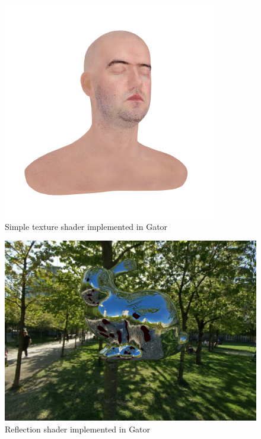 {\begin{figure}
\centering
\includegraphics[width=.7\linewidth]{fig/texture.png}
\caption{Simple texture shader implemented in Gator}
\label{fig:texture}
\end{figure}
\begin{figure}
		\centering
		\includegraphics[width=.7\linewidth]{fig/reflection.png}
		\caption{Reflection  shader implemented in Gator}
		\label{fig:reflection}
\end{figure}
	
}
